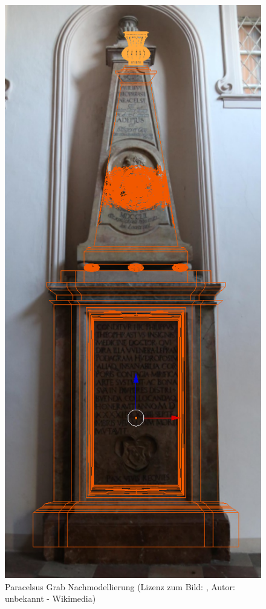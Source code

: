 \begin{figure}[H]
    \centering
    \includegraphics[width=.8\textwidth]{images/Paracelsus-Grab_Nachmodellierung.png}
    \caption{Paracelsus Grab Nachmodellierung (Lizenz zum Bild: \citep{paracelsusgrab:bild}, Autor: unbekannt - Wikimedia)}
    \label{Paracelsus_Grab:image2}
\end{figure}

